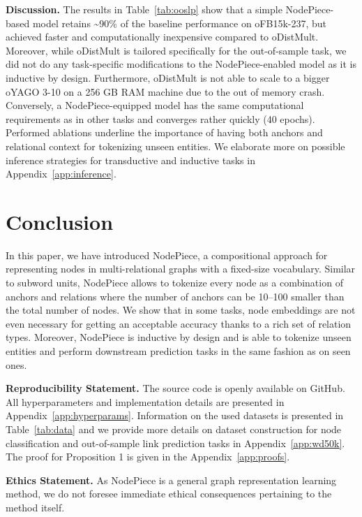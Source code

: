 \documentclass{article} \usepackage{iclr2022_conference,times}
\begin{document}
\textbf{Discussion.} 
The results in Table~\ref{tab:ooslp} show that a simple NodePiece-based model retains \textasciitilde{}90\% of the baseline performance on oFB15k-237, but achieved faster and computationally inexpensive compared to oDistMult. 
Moreover, while oDistMult is tailored specifically for the out-of-sample task, we did not do any task-specific modifications to the NodePiece-enabled model as it is inductive by design. 
Furthermore, oDistMult is not able to scale to a bigger oYAGO 3-10 on a 256 GB RAM machine due to the out of memory crash.
Conversely, a NodePiece-equipped model has the same computational requirements as in other tasks and converges rather quickly (40 epochs). 
Performed ablations underline the importance of having both anchors and relational context for tokenizing unseen entities.
We elaborate more on possible inference strategies for transductive and inductive tasks in Appendix~\ref{app:inference}.

\section{Conclusion}

In this paper, we have introduced NodePiece, a compositional approach for representing nodes in multi-relational graphs with a fixed-size vocabulary. 
Similar to subword units, NodePiece allows to tokenize every node as a combination of anchors and relations where the number of anchors can be 10--100 smaller than the total number of nodes. 
We show that in some tasks, node embeddings are not even necessary for getting an acceptable accuracy thanks to a rich set of relation types. 
Moreover, NodePiece is inductive by design and is able to tokenize unseen entities and perform downstream prediction tasks in the same fashion as on seen ones.

\textbf{Reproducibility Statement.}
The source code is openly available on GitHub. All hyperparameters and implementation details are presented in Appendix~\ref{app:hyperparams}. Information on the used datasets is presented in Table~\ref{tab:data} and we provide more details on dataset construction for node classification and out-of-sample link prediction tasks in Appendix~\ref{app:wd50k}.  The proof for Proposition 1 is given in the Appendix~\ref{app:proofs}.

\textbf{Ethics Statement.} 
As NodePiece is a general graph representation learning method, we do not foresee immediate ethical consequences pertaining to the method itself.
\end{document}
